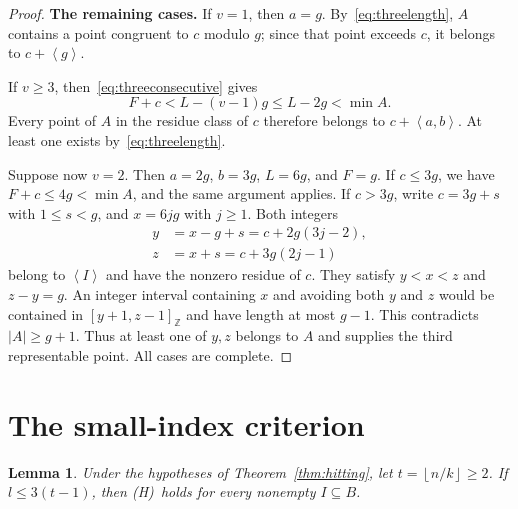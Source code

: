 \documentclass[11pt,a4paper]{article}
\numberwithin{equation}{section}
\newtheorem{lemma}[theorem]{Lemma}
\theoremstyle{remark}
\newcommand{\Z}{\mathbb Z}
\newcommand{\sg}[1]{\left\langle #1\right\rangle}
\newcommand{\floor}[1]{\left\lfloor #1\right\rfloor}
\newcommand{\Hcond}{\textup{(H)}}
\newcommand{\interval}[2]{[#1,#2]_{\Z}}
\begin{document}
\begin{proof}
\textbf{The remaining cases.}
If $v=1$, then $a=g$.
By~\eqref{eq:threelength}, $A$ contains a point congruent to $c$
modulo $g$; since that point exceeds $c$, it belongs to
$c+\sg{g}$.

If $v\ge3$, then~\eqref{eq:threeconsecutive} gives
\[
  F+c<L-(v-1)g\le L-2g<\min A.
\]
Every point of $A$ in the residue class of $c$ therefore belongs to
$c+\sg{a,b}$. At least one exists by~\eqref{eq:threelength}.

Suppose now $v=2$. Then $a=2g$, $b=3g$, $L=6g$, and $F=g$.
If $c\le3g$, we have $F+c\le4g<\min A$, and the same argument
applies.
If $c>3g$, write $c=3g+s$ with $1\le s<g$, and $x=6jg$
with $j\ge1$. Both integers
\begin{equation}\label{eq:threewitnesses}
  \begin{split}
  y&=x-g+s=c+2g(3j-2),\\
  z&=x+s=c+3g(2j-1)
  \end{split}
\end{equation}
belong to $\sg{I}$ and have the nonzero residue of $c$.
They satisfy $y<x<z$ and $z-y=g$.
An integer interval containing $x$ and avoiding both $y$ and $z$
would be contained in $\interval{y+1}{z-1}$ and have length at most
$g-1$. This contradicts $|A|\ge g+1$.
Thus at least one of $y,z$ belongs to $A$ and supplies the third
representable point. All cases are complete.
\end{proof}

\section{The small-index criterion}\label{sec:small}

\begin{lemma}\label{lem:small}
Under the hypotheses of Theorem~\ref{thm:hitting}, let
$t=\floor{n/k}\ge2$. If $l\le3(t-1)$, then \Hcond\ holds for every
nonempty $I\subseteq B$.
\end{lemma}
\end{document}

